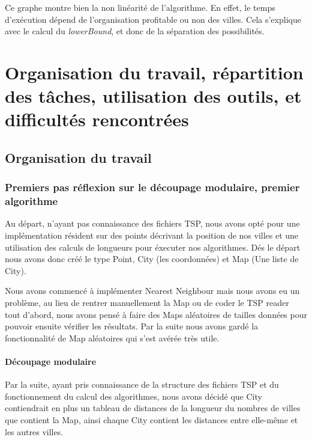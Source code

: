 \documentclass[12pt]{report}
\begin{document}
{{{{{{{Ce graphe montre bien la non linéarité de l'algorithme. En effet, le temps d'exécution dépend de l'organisation profitable ou non des villes. Cela s'explique avec le calcul du \textit{lowerBound}, et donc de la séparation des possibilités.



\chapter{Organisation du travail, répartition des tâches, utilisation des outils, et difficultés rencontrées}

\section{Organisation du travail}

\subsection{Premiers pas réflexion sur le découpage modulaire, premier algorithme}

Au départ, n'ayant pas connaissance des fichiers TSP, nous avons opté pour une implémentation résident sur des points décrivant la position de nos villes et une utilisation des calculs de longueurs pour éxecuter nos algorithmes. Dés le départ nous avons donc créé le type Point, City (les coordonnées) et Map (Une liste de City).

Nous avons commencé à implémenter Nearest Neighbour mais nous avons eu un problème, au lieu de rentrer manuellement la Map ou de coder le TSP reader tout d'abord, nous avons pensé à faire des Maps aléatoires de tailles données pour pouvoir ensuite vérifier les résultats. Par la suite nous avons gardé la fonctionnalité de Map aléatoires qui s'est avérée très utile.

\subsubsection{Découpage modulaire}

Par la suite, ayant pris connaissance de la structure des fichiers TSP et du fonctionnement du calcul des algorithmes, nous avons décidé que City contiendrait en plus un tableau de distances de la longueur du nombres de villes que contient la Map, ainsi chaque City contient les distances entre elle-même et les autres villes.

}}}}}}}
\end{document}
